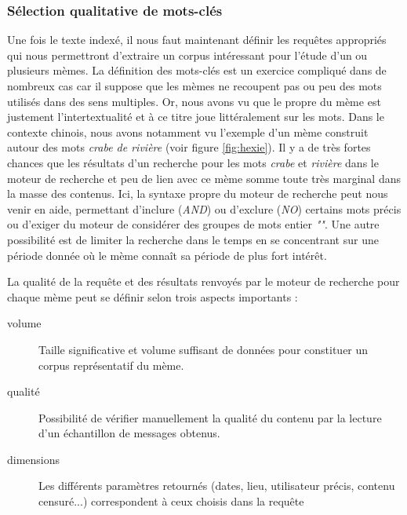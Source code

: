 \subsubsection[Sélection qualitative de mots-clés]{Sélection qualitative de mots-clés}

Une fois le texte indexé, il nous faut maintenant définir les requêtes appropriés qui nous permettront d'extraire un corpus intéressant pour l'étude d'un ou plusieurs mèmes. La définition des mots-clés est un exercice compliqué dans de nombreux cas car il suppose que les mèmes ne recoupent pas ou peu des mots utilisés dans des sens multiples. Or, nous avons vu que le propre du mème est justement l'intertextualité et à ce titre joue littéralement sur les mots. Dans le contexte chinois, nous avons notamment vu l'exemple d'un mème construit autour des mots \textit{crabe de rivière} (voir figure \ref{fig:hexie}). Il y a de très fortes chances que les résultats d'un recherche pour les mots \textit{crabe} et \textit{rivière} dans le moteur de recherche et peu de lien avec ce mème somme toute très marginal dans la masse des contenus. Ici, la syntaxe propre du moteur de recherche peut nous venir en aide, permettant d'inclure (\textit{AND}) ou d'exclure (\textit{NO}) certains mots précis ou d'exiger du moteur de considérer des groupes de mots entier \textit{""}. Une autre possibilité est de limiter la recherche dans le temps en se concentrant sur une période donnée où le  mème connaît sa période de plus fort intérêt.

La qualité de la requête et des résultats renvoyés par le moteur de recherche pour chaque mème peut se définir  selon trois aspects importants :

\begin{description}
    \item[volume]
        Taille significative et volume suffisant de données pour constituer un corpus représentatif du mème.
    \item[qualité]
        Possibilité de vérifier manuellement la qualité du contenu par la lecture d{\textquoteright}un échantillon de  messages obtenus.
    \item[dimensions]
        Les différents paramètres retournés (dates, lieu, utilisateur précis, contenu censuré...) correspondent à ceux choisis dans la requête
\end{description}

